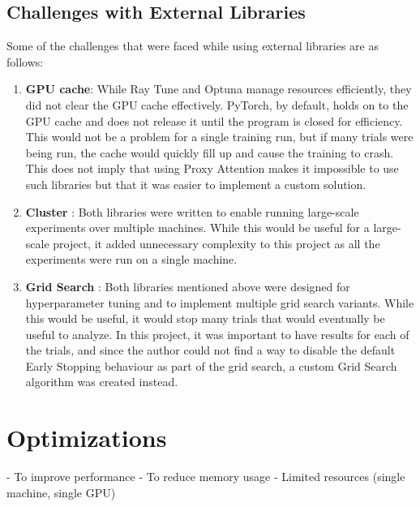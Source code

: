 \subsection{Challenges with External Libraries} \label{sec:challenges_with_external_libraries}
Some of the challenges that were faced while using external libraries are as follows:
\begin{enumerate}
    \item \textbf{GPU cache}: While Ray Tune and Optuna manage resources efficiently, they did not clear the GPU cache effectively. PyTorch, by default, holds on to the GPU cache and does not release it until the program is closed for efficiency. This would not be a problem for a single training run, but if many trials were being run, the cache would quickly fill up and cause the training to crash. This does not imply that using Proxy Attention makes it impossible to use such libraries but that it was easier to implement a custom solution.
    \item \textbf{Cluster} : Both libraries were written to enable running large-scale experiments over multiple machines. While this would be useful for a large-scale project, it added unnecessary complexity to this project as all the experiments were run on a single machine.
    \item \textbf{Grid Search} : Both libraries mentioned above were designed for hyperparameter tuning and to implement multiple grid search variants. While this would be useful, it would stop many trials that would eventually be useful to analyze. In this project, it was important to have results for each of the trials, and since the author could not find a way to disable the default Early Stopping behaviour as part of the grid search, a custom Grid Search algorithm was created instead.
\end{enumerate}

\section{Optimizations}
- To improve performance 
- To reduce memory usage
- Limited resources (single machine, single GPU)

